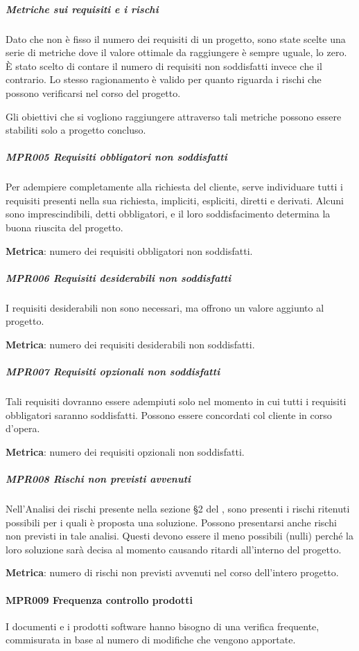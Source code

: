 				\subparagraph*{Metriche sui requisiti e i rischi}
				Dato che non è fisso il numero dei requisiti di un progetto, sono state scelte una serie di metriche dove il valore ottimale da raggiungere è sempre uguale,
				lo zero. È stato scelto di contare il numero di requisiti non soddisfatti invece che il contrario. Lo stesso ragionamento è valido per quanto
				riguarda i rischi che possono verificarsi nel corso del progetto.

				Gli obiettivi che si vogliono raggiungere attraverso tali metriche possono essere stabiliti solo a progetto concluso.

				\subparagraph{MPR005 Requisiti obbligatori non soddisfatti}
				Per adempiere completamente alla richiesta del cliente, serve individuare tutti i requisiti presenti nella sua richiesta, impliciti, espliciti, diretti e derivati. Alcuni sono imprescindibili, detti obbligatori, e il loro soddisfacimento determina la buona riuscita del progetto.

				\textbf{Metrica}: numero dei requisiti obbligatori non soddisfatti.

				\subparagraph{MPR006 Requisiti desiderabili non soddisfatti}
				I requisiti desiderabili non sono necessari, ma offrono un valore aggiunto al progetto.

				\textbf{Metrica}: numero dei requisiti desiderabili non soddisfatti.

				\subparagraph{MPR007 Requisiti opzionali non soddisfatti}
				Tali requisiti dovranno essere adempiuti solo nel momento in cui tutti i requisiti obbligatori saranno soddisfatti.
				Possono essere concordati col cliente in corso d'opera.

				\textbf{Metrica}: numero dei requisiti opzionali non soddisfatti.

				\subparagraph{MPR008 Rischi non previsti avvenuti} %
				Nell'Analisi dei rischi presente nella sezione §2 del \Doc{\PdPv}, sono presenti i rischi ritenuti possibili per i quali è proposta una soluzione.
				Possono presentarsi anche rischi non previsti in tale analisi. Questi devono essere il meno possibili (nulli) perché la loro soluzione sarà decisa al momento causando ritardi all'interno del progetto.

				\textbf{Metrica}: numero di rischi non previsti avvenuti nel corso dell'intero progetto.

				\paragraph{MPR009 Frequenza controllo prodotti}
				I documenti e i prodotti software hanno bisogno di una verifica frequente, commisurata in base al numero di modifiche che vengono apportate.

